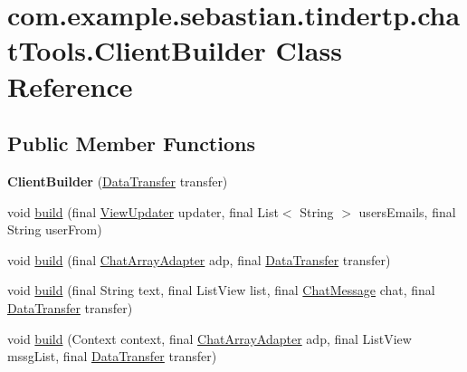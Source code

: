 \hypertarget{classcom_1_1example_1_1sebastian_1_1tindertp_1_1chatTools_1_1ClientBuilder}{}\section{com.\+example.\+sebastian.\+tindertp.\+chat\+Tools.\+Client\+Builder Class Reference}
\label{classcom_1_1example_1_1sebastian_1_1tindertp_1_1chatTools_1_1ClientBuilder}
\subsection*{Public Member Functions}
\begin{DoxyCompactItemize}
\item 
{\bfseries Client\+Builder} (\hyperlink{interfacecom_1_1example_1_1sebastian_1_1tindertp_1_1DataTransfer}{Data\+Transfer} transfer)\hypertarget{classcom_1_1example_1_1sebastian_1_1tindertp_1_1chatTools_1_1ClientBuilder_ab8a1f8735877585aa3116450ac690cd5}{}\label{classcom_1_1example_1_1sebastian_1_1tindertp_1_1chatTools_1_1ClientBuilder_ab8a1f8735877585aa3116450ac690cd5}

\item 
void \hyperlink{classcom_1_1example_1_1sebastian_1_1tindertp_1_1chatTools_1_1ClientBuilder_a84c8904454dbc0c98dc5519567ed939b}{build} (final \hyperlink{interfacecom_1_1example_1_1sebastian_1_1tindertp_1_1ViewUpdater}{View\+Updater} updater, final List$<$ String $>$ users\+Emails, final String user\+From)
\item 
void \hyperlink{classcom_1_1example_1_1sebastian_1_1tindertp_1_1chatTools_1_1ClientBuilder_a59e84af6f975cf618d2d36c2aa3a6d64}{build} (final \hyperlink{classcom_1_1example_1_1sebastian_1_1tindertp_1_1chatTools_1_1ChatArrayAdapter}{Chat\+Array\+Adapter} adp, final \hyperlink{interfacecom_1_1example_1_1sebastian_1_1tindertp_1_1DataTransfer}{Data\+Transfer} transfer)
\item 
void \hyperlink{classcom_1_1example_1_1sebastian_1_1tindertp_1_1chatTools_1_1ClientBuilder_ac09b2b950cd7116f84bacc5a366ec33d}{build} (final String text, final List\+View list, final \hyperlink{classcom_1_1example_1_1sebastian_1_1tindertp_1_1chatTools_1_1ChatMessage}{Chat\+Message} chat, final \hyperlink{interfacecom_1_1example_1_1sebastian_1_1tindertp_1_1DataTransfer}{Data\+Transfer} transfer)
\item 
void \hyperlink{classcom_1_1example_1_1sebastian_1_1tindertp_1_1chatTools_1_1ClientBuilder_a59be5c24aa674e233fe21eac707cc114}{build} (Context context, final \hyperlink{classcom_1_1example_1_1sebastian_1_1tindertp_1_1chatTools_1_1ChatArrayAdapter}{Chat\+Array\+Adapter} adp, final List\+View mssg\+List, final \hyperlink{interfacecom_1_1example_1_1sebastian_1_1tindertp_1_1DataTransfer}{Data\+Transfer} transfer)
\end{DoxyCompactItemize}
